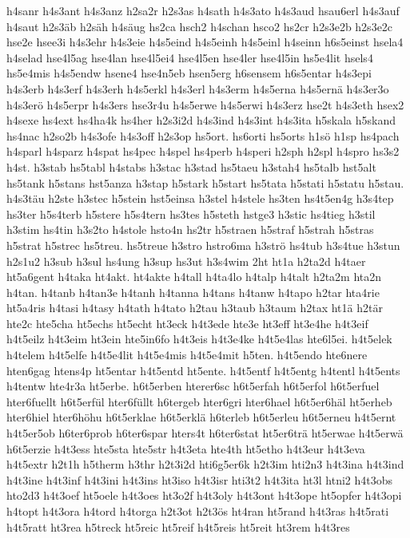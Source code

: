 {h4sanr
h4s3ant
h4s3anz
h2sa2r
h2s3as
h4sath
h4s3ato
h4s3aud
hsau6erl
h4s3auf
h4saut
h2s3äb
h2säh
h4säug
hs2ca
hsch2
h4schan
hsco2
hs2cr
h2s3e2b
h2s3e2c
hse2e
hsee3i
h4s3ehr
h4s3eie
h4s5eind
h4s5einh
h4s5einl
h4seinn
h6s5einst
hsela4
h4selad
hse4l5ag
hse4lan
hse4l5ei4
hse4l5en
hse4ler
hse4l5in
hs5e4lit
hsels4
hs5e4mis
h4s5endw
hsene4
hse4n5eb
hsen5erg
h6sensem
h6s5entar
h4s3epi
h4s3erb
h4s3erf
h4s3erh
h4s5erkl
h4s3erl
h4s3erm
h4s5erna
h4s5ernä
h4s3er3o
h4s3erö
h4s5erpr
h4s3ers
hse3r4u
h4s5erwe
h4s5erwi
h4s3erz
hse2t
h4s3eth
hsex2
h4sexe
hs4ext
hs4ha4k
hs4her
h2s3i2d
h4s3ind
h4s3int
h4s3ita
h5skala
h5skand
hs4nac
h2so2b
h4s3ofe
h4s3off
h2s3op
hs5ort.
hs6orti
hs5orts
h1sö
h1sp
hs4pach
h4sparl
h4sparz
h4spat
hs4pec
h4spel
hs4perb
h4speri
h2sph
h2spl
h4spro
hs3s2
h4st.
h3stab
hs5tabl
h4stabs
h3stac
h3stad
hs5taeu
h3stah4
hs5talb
hst5alt
hs5tank
h5stans
hst5anza
h3stap
h5stark
h5start
hs5tata
h5stati
h5statu
h5stau.
h4s3täu
h2ste
h3stec
h5stein
hst5einsa
h3stel
h4stele
hs3ten
hs4t5en4g
h3s4tep
hs3ter
h5s4terb
h5stere
h5s4tern
hs3tes
h5steth
hstge3
h3stic
hs4tieg
h3stil
h3stim
hs4tin
h3s2to
h4stole
hsto4n
hs2tr
h5straen
h5straf
h5strah
h5stras
h5strat
h5strec
hs5treu.
hs5treue
h3stro
hstro6ma
h3strö
hs4tub
h3s4tue
h3stun
h2s1u2
h3sub
h3sul
hs4ung
h3sup
hs3ut
h3s4wim
2ht
ht1a
h2ta2d
h4taer
ht5a6gent
h4taka
ht4akt.
ht4akte
h4tall
h4ta4lo
h4talp
h4talt
h2ta2m
hta2n
h4tan.
h4tanb
h4tan3e
h4tanh
h4tanna
h4tans
h4tanw
h4tapo
h2tar
hta4rie
ht5a4ris
h4tasi
h4tasy
h4tath
h4tato
h2tau
h3taub
h3taum
h2tax
ht1ä
h2tär
hte2c
hte5cha
ht5echs
ht5echt
ht3eck
h4t3ede
hte3e
ht3eff
ht3e4he
h4t3eif
h4t5eilz
h4t3eim
ht3ein
hte5in6fo
h4t3eis
h4t3e4ke
h4t5e4las
hte6l5ei.
h4t5elek
h4telem
h4t5elfe
h4t5e4lit
h4t5e4mis
h4t5e4mit
h5ten.
h4t5endo
hte6nere
hten6gag
htens4p
ht5entar
h4t5entd
ht5ente.
h4t5entf
h4t5entg
h4tentl
h4t5ents
h4tentw
hte4r3a
ht5erbe.
h6t5erben
hterer6sc
h6t5erfah
h6t5erfol
h6t5erfuel
hter6fuellt
h6t5erfül
hter6füllt
h6tergeb
hter6gri
hter6hael
h6t5er6häl
ht5erheb
hter6hiel
hter6höhu
h6t5erklae
h6t5erklä
h6terleb
h6t5erleu
h6t5erneu
h4t5ernt
h4t5er5ob
h6ter6prob
h6ter6spar
hters4t
h6ter6stat
ht5er6trä
ht5erwae
h4t5erwä
h6t5erzie
h4t3ess
hte5sta
hte5str
h4t3eta
hte4th
ht5etho
h4t3eur
h4t3eva
h4t5extr
h2t1h
h5therm
h3thr
h2t3i2d
hti6g5er6k
h2t3im
hti2n3
h4t3ina
h4t3ind
h4t3ine
h4t3inf
h4t3ini
h4t3ins
ht3iso
h4t3isr
hti3t2
h4t3ita
ht3l
htni2
h4t3obs
hto2d3
h4t3oef
ht5oele
h4t3oes
ht3o2f
h4t3oly
h4t3ont
h4t3ope
ht5opfer
h4t3opi
h4topt
h4t3ora
h4tord
h4torga
h2t3ot
h2t3ös
ht4ran
ht5rand
h4t3ras
h4t5rati
h4t5ratt
ht3rea
h5treck
ht5reic
ht5reif
h4t5reis
ht5reit
ht3rem
h4t3res
}
